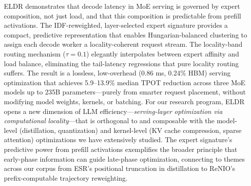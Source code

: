 \documentclass[11pt,a4paper]{article}
\begin{document}
ELDR demonstrates that decode latency in MoE serving is governed by expert composition, not just load, and that this composition is predictable from prefill activations. The IDF-reweighted, layer-selected expert signature provides a compact, predictive representation that enables Hungarian-balanced clustering to assign each decode worker a locality-coherent request stream. The locality-band routing mechanism ($\tau = 0.1$) elegantly interpolates between expert affinity and load balance, eliminating the tail-latency regressions that pure locality routing suffers. The result is a lossless, low-overhead (0.86 ms, 0.24\% HBM) serving optimization that achieves 5.9--13.9\% median TPOT reduction across three MoE models up to 235B parameters---purely from smarter request placement, without modifying model weights, kernels, or batching. For our research program, ELDR opens a new dimension of LLM efficiency---\emph{serving-layer optimization via computational locality}---that is orthogonal to and composable with the model-level (distillation, quantization) and kernel-level (KV cache compression, sparse attention) optimizations we have extensively studied. The expert signature's predictive power from prefill activations exemplifies the broader principle that early-phase information can guide late-phase optimization, connecting to themes across our corpus from ESR's positional truncation in distillation to ReNIO's prefix-computable trajectory reweighting.
\end{document}
